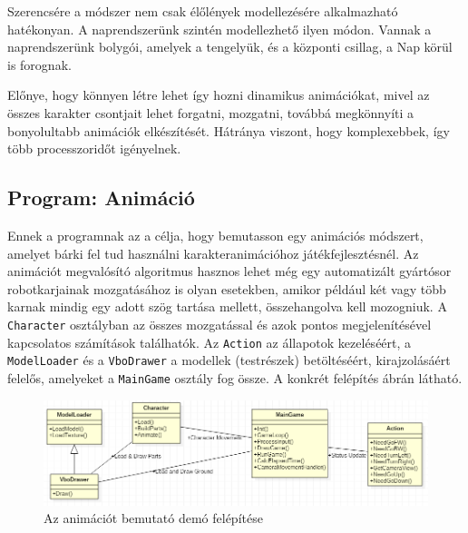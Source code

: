 
Szerencsére a módszer nem csak élőlények modellezésére alkalmazható hatékonyan. A naprendszerünk szintén modellezhető ilyen módon. Vannak a naprendszerünk bolygói, amelyek a tengelyük, és a központi csillag, a Nap körül is forognak.

Előnye, hogy könnyen létre lehet így hozni dinamikus animációkat, mivel az összes karakter csontjait lehet forgatni, mozgatni, továbbá megkönnyíti a bonyolultabb animációk elkészítését. Hátránya viszont, hogy komplexebbek, így több processzoridőt igényelnek.

\subsection{Program: Animáció}

Ennek a programnak az a célja, hogy bemutasson egy animációs módszert, amelyet bárki fel tud használni karakteranimációhoz játékfejlesztésnél. Az animációt megvalósító algoritmus hasznos lehet még egy automatizált gyártósor robotkarjainak mozgatásához is olyan esetekben, amikor például két vagy több karnak mindig egy adott szög tartása mellett, összehangolva kell mozogniuk. A \texttt{Character} osztályban az összes mozgatással és azok pontos megjelenítésével kapcsolatos számítások találhatók. Az \texttt{Action} az állapotok kezeléséért, a \texttt{ModelLoader} és a \texttt{VboDrawer} a modellek (testrészek) betöltéséért, kirajzolásáért felelős, amelyeket a \texttt{MainGame} osztály fog össze. A konkrét felépítés  ábrán látható.

\begin{figure}[h]
\centering
\includegraphics[scale=0.6]{kepek/animation_uml.png}
\caption[]{Az animációt bemutató demó felépítése}
\label{fig:anim_uml}
\end{figure}

